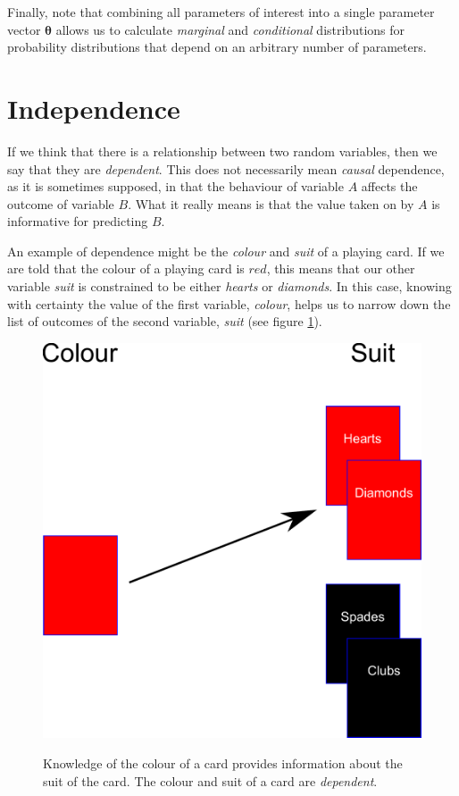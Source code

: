 \documentclass[11pt,fullpage]{book}
\begin{document}
Finally, note that combining all parameters of interest into a single parameter vector $\boldsymbol{\theta}$ allows us to calculate \textit{marginal} and \textit{conditional} distributions for probability distributions that depend on an arbitrary number of parameters.

\section{Independence}\label{sec:Probability_independence}
If we think that there is a relationship between two random variables, then we say that they are \textit{dependent}. This does not necessarily mean \textit{causal} dependence, as it is sometimes supposed, in that the behaviour of variable $A$ affects the outcome of variable $B$. What it really means is that the value taken on by $A$ is informative for predicting $B$. 

An example of dependence might be the \textit{colour} and \textit{suit} of a playing card. If we are told that the colour of a playing card is $red$, this means that our other variable \textit{suit} is constrained to be either \textit{hearts} or \textit{diamonds}. In this case, knowing with certainty the value of the first variable, \textit{colour}, helps us to narrow down the list of outcomes of the second variable, \textit{suit} (see figure \ref{fig:Probability_IndependenceCards}).

\begin{figure}
\centering
\scalebox{0.3} 
{\includegraphics{Probability_IndependenceCards.pdf}}
\caption{Knowledge of the colour of a card provides information about the suit of the card. The colour and suit of a card are \textit{dependent}.}\label{fig:Probability_IndependenceCards}
\end{figure}
\end{document}
